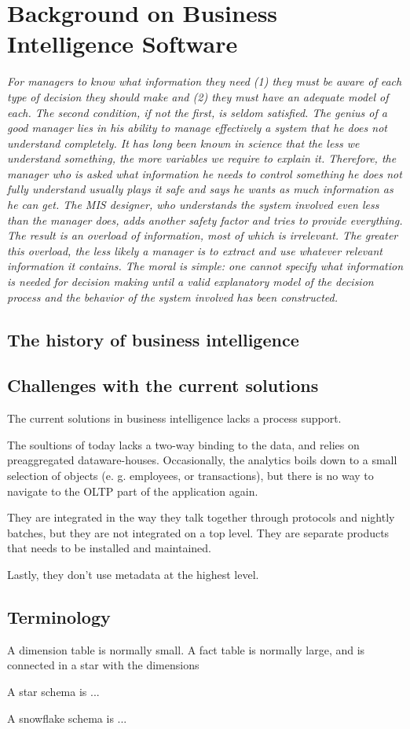 \section{Background on Business Intelligence Software}
\label{sec:bi-background}
\textit{For managers to know what information they need (1) they must be aware of each type of decision they should make and (2) they must have an adequate model of each. The second condition, if not the first, is seldom satisfied. The genius of a good manager lies in his ability to manage effectively a system that he does not understand completely. It has long been known in science that the less we understand something, the more variables we require to explain it. Therefore, the manager who is asked what information he needs to control something he does not fully understand usually plays it safe and says he wants as much information as he can get. The MIS designer, who understands the system involved even less than the manager does, adds another safety factor and tries to provide everything. The result is an overload of information, most of which is irrelevant. The greater this overload, the less likely a manager is to extract and use whatever relevant information it contains. The moral is simple: one cannot specify what information is needed for decision making until a valid explanatory model of the decision process and the behavior of the system involved has been constructed.}


\subsection{The history of business intelligence}


\subsection{Challenges with the current solutions}
The current solutions in business intelligence lacks a process support.

The soultions of today lacks a two-way binding to the data, and relies on preaggregated dataware-houses. Occasionally, the analytics boils down to a small selection of objects (e. g. employees, or transactions), but there is no way to navigate to the OLTP part of the application again.

They are integrated in the way they talk together through protocols and nightly batches, but they are not integrated on a top level. They are separate products that needs to be installed and maintained.

Lastly, they don't use metadata at the highest level.

\subsection{Terminology}
\label{sub:Terminology}

A dimension table is normally small. A fact table is normally large, and is connected in a star with the dimensions

A star schema is ...

A snowflake schema is ...
